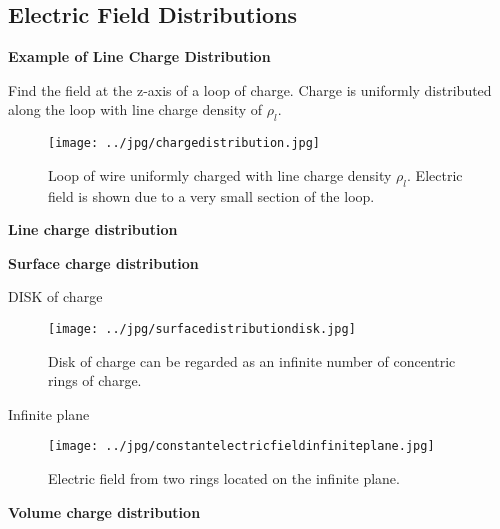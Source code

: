 \subsection{Electric Field Distributions}

{\bf Example of Line Charge Distribution}

Find the field at the z-axis of a loop of charge. Charge is uniformly distributed along the loop with line charge density of $\rho_l$.





\begin{figure}[htbp]
\begin{center}
\texttt{[image: ../jpg/chargedistribution.jpg]}
\end{center}
\caption{Loop of wire uniformly charged with line charge density $\rho_l$. Electric field is shown due to a very small section of the loop.}
\label{linecharge}
\end{figure}








{\bf Line charge distribution}


{\bf Surface charge distribution}


DISK of charge



\begin{figure}[htbp]
\begin{center}
\texttt{[image: ../jpg/surfacedistributiondisk.jpg]}
\end{center}
\caption{Disk of charge can be regarded as an infinite number of concentric rings of charge.}
\label{diskcharge}
\end{figure}



Infinite plane


\begin{figure}[htbp]
\begin{center}
\texttt{[image: ../jpg/constantelectricfieldinfiniteplane.jpg]}
\end{center}
\caption{Electric field from two rings located on the infinite plane.}
\label{diskcharge}
\end{figure}





{\bf Volume charge distribution}





